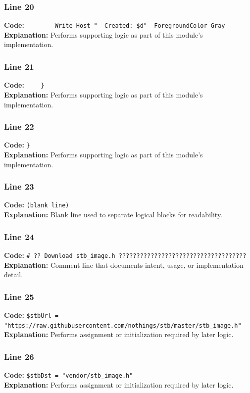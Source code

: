 \documentclass[11pt,a4paper]{article}
\begin{document}
\subsubsection*{Line 20}
\textbf{Code:} \verb|        Write-Host "  Created: $d" -ForegroundColor Gray|\\
\textbf{Explanation:} Performs supporting logic as part of this module's implementation.

\subsubsection*{Line 21}
\textbf{Code:} \verb|    }|\\
\textbf{Explanation:} Performs supporting logic as part of this module's implementation.

\subsubsection*{Line 22}
\textbf{Code:} \verb|}|\\
\textbf{Explanation:} Performs supporting logic as part of this module's implementation.

\subsubsection*{Line 23}
\textbf{Code:} \texttt{(blank line)}\\
\textbf{Explanation:} Blank line used to separate logical blocks for readability.

\subsubsection*{Line 24}
\textbf{Code:} \verb|# ?? Download stb_image.h ????????????????????????????????????|\\
\textbf{Explanation:} Comment line that documents intent, usage, or implementation detail.

\subsubsection*{Line 25}
\textbf{Code:} \verb|$stbUrl = "https://raw.githubusercontent.com/nothings/stb/master/stb_image.h"|\\
\textbf{Explanation:} Performs assignment or initialization required by later logic.

\subsubsection*{Line 26}
\textbf{Code:} \verb|$stbDst = "vendor/stb_image.h"|\\
\textbf{Explanation:} Performs assignment or initialization required by later logic.
\end{document}
